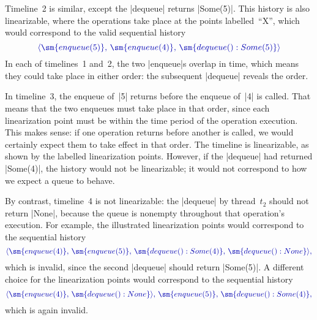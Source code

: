 
Timeline~2 is similar, except the |dequeue| returns |Some(5)|.  This history
is also linearizable, where the operations take place at the points
labelled~``{\scalashape X}'', which would correspond to the valid sequential
history
\[\mstyle
\seq{ \sm{enqueue(5)},\, \sm{enqueue(4)},\, \sm{dequeue():Some(5)}}
\]
In each of timelines~1 and~2, the two |enqueue|s overlap in time, which means
they could take place in either order: the subsequent |dequeue| reveals the
order. 


In timeline~3, the enqueue of~|5| returns before the enqueue of~|4| is called.
That means that the two enqueues must take place in that order, since each
linearization point must be within the time period of the operation execution.
This makes sense: if one operation returns before another is called, we would
certainly expect them to take effect in that order.  The timeline is
linearizable, as shown by the labelled linearization points.  However, if the
|dequeue| had returned |Some(4)|, the history would not be linearizable; it
would not correspond to how we expect a queue to behave.

By contrast, timeline~4 is not linearizable: the |dequeue| by thread~$t_2$
should not return |None|, because the queue is nonempty throughout that
operation's execution.  For example, the illustrated linearization points
would correspond to the sequential history
\[\mstyle
\seq{ \sm{enqueue(4)},\, \sm{enqueue(5)},\,
   \sm{dequeue():Some(4)},\, \sm{dequeue():None}},
\]
which is invalid, since the second |dequeue| should return |Some(5)|.  A
different choice for the linearization points would correspond to the
sequential history
\[\mstyle
\seq{ \sm{enqueue(4)},\, \sm{dequeue():None}},\, \sm{enqueue(5)},\,
   \sm{dequeue():Some(4)},
\]
which is again invalid.


